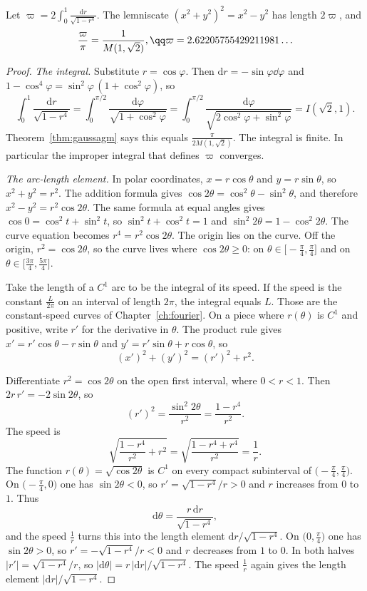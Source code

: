 \begin{corollary}\label{cor:lemniscate}
Let $\varpi=2\int_0^1\frac{\mathrm dr}{\sqrt{1-r^4}}$. The lemniscate $(x^2+y^2)^2=x^2-y^2$ has length $2\varpi$, and
\[
\begin{gathered}\frac\varpi\pi=\frac1{M(1,\sqrt2)},\qq\varpi=2.62205755429211981\ldots\end{gathered}
\]
\end{corollary}
\begin{proof}
\emph{The integral.}
Substitute $r=\cos\varphi$. Then $\mathrm dr=-\sin\varphi\dd\varphi$ and $1-\cos^4\varphi=\sin^2\varphi\,(1+\cos^2\varphi)$, so
\[
\int_0^1\frac{\mathrm dr}{\sqrt{1-r^4}}=\int_0^{\pi/2}\frac{\mathrm d\varphi}{\sqrt{1+\cos^2\varphi}}=\int_0^{\pi/2}\frac{\mathrm d\varphi}{\sqrt{2\cos^2\varphi+\sin^2\varphi}}=I(\sqrt2,1).
\]
Theorem~\ref{thm:gaussagm} says this equals $\frac\pi{2M(1,\sqrt2)}$. The integral is finite. In particular the improper integral that defines $\varpi$ converges.

\emph{The arc-length element.}
In polar coordinates, $x=r\cos\theta$ and $y=r\sin\theta$, so $x^2+y^2=r^2$. The addition formula gives $\cos2\theta=\cos^2\theta-\sin^2\theta$, and therefore $x^2-y^2=r^2\cos2\theta$. The same formula at equal angles gives $\cos0=\cos^2 t+\sin^2 t$, so $\sin^2 t+\cos^2 t=1$ and $\sin^2 2\theta=1-\cos^2 2\theta$. The curve equation becomes $r^4=r^2\cos2\theta$. The origin lies on the curve. Off the origin, $r^2=\cos2\theta$, so the curve lives where $\cos2\theta\ge0$: on $\theta\in\bigl[-\frac\pi4,\frac\pi4\bigr]$ and on $\theta\in\bigl[\frac{3\pi}4,\frac{5\pi}4\bigr]$.

Take the length of a $C^1$ arc to be the integral of its speed. If the speed is the constant $\frac L{2\pi}$ on an interval of length $2\pi$, the integral equals $L$. Those are the constant-speed curves of Chapter~\ref{ch:fourier}. On a piece where $r(\theta)$ is $C^1$ and positive, write $r'$ for the derivative in $\theta$. The product rule gives $x'=r'\cos\theta-r\sin\theta$ and $y'=r'\sin\theta+r\cos\theta$, so
\[
(x')^2+(y')^2=(r')^2+r^2.
\]

Differentiate $r^2=\cos2\theta$ on the open first interval, where $0<r<1$. Then $2r\,r'=-2\sin2\theta$, so
\[
(r')^2=\frac{\sin^2 2\theta}{r^2}=\frac{1-r^4}{r^2}.
\]
The speed is
\[
\sqrt{\frac{1-r^4}{r^2}+r^2}=\sqrt{\frac{1-r^4+r^4}{r^2}}=\frac1r.
\]
The function $r(\theta)=\sqrt{\cos2\theta}$ is $C^1$ on every compact subinterval of $\bigl(-\frac\pi4,\frac\pi4\bigr)$. On $\bigl(-\frac\pi4,0\bigr)$ one has $\sin2\theta<0$, so $r'=\sqrt{1-r^4}/r>0$ and $r$ increases from $0$ to $1$. Thus
\[
\mathrm d\theta=\frac{r\,\mathrm dr}{\sqrt{1-r^4}},
\]
and the speed $\frac1r$ turns this into the length element $\mathrm dr\big/\sqrt{1-r^4}$. On $\bigl(0,\frac\pi4\bigr)$ one has $\sin2\theta>0$, so $r'=-\sqrt{1-r^4}/r<0$ and $r$ decreases from $1$ to $0$. In both halves $|r'|=\sqrt{1-r^4}/r$, so $|\mathrm d\theta|=r\,|\mathrm dr|/\sqrt{1-r^4}$. The speed $\frac1r$ again gives the length element $|\mathrm dr|\big/\sqrt{1-r^4}$.


\end{proof}
